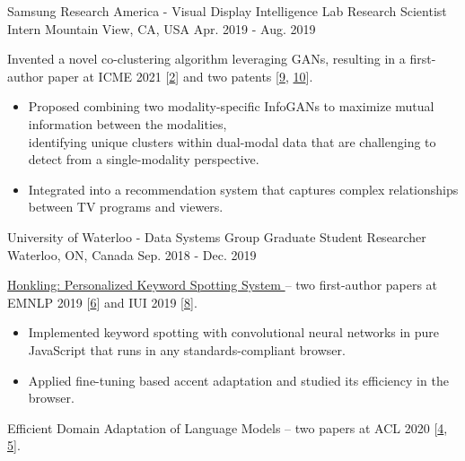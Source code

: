 \begin{cventries}
{\begin{cvitems}
\end{cvitems}
}
\cventry
{Samsung Research America - Visual Display Intelligence Lab} %
{Research Scientist Intern} %
{Mountain View, CA, USA} %
{Apr. 2019 - Aug. 2019} %
{ %
\begin{cvitems}
\item {Invented a novel co-clustering algorithm leveraging GANs, resulting in a first-author paper at ICME 2021 [\hyperlink{CI-GAN:ICME}{2}] and two patents [\hyperlink{CI-GAN:International}{9}, \hyperlink{CI-GAN:US}{10}].}
\begin{itemize}[label=$\cdot$,leftmargin=0.7em]
\item {Proposed combining two modality-specific InfoGANs to maximize mutual information between the modalities, \\ identifying unique clusters within dual-modal data that are challenging to detect from a single-modality perspective.}
\item {Integrated into a recommendation system that captures complex relationships between TV programs and viewers.}
\end{itemize}
\end{cvitems}
}
\cventry
{University of Waterloo - Data Systems Group} %
{Graduate Student Researcher} %
{Waterloo, ON, Canada} %
{Sep. 2018 - Dec. 2019} %
{ %
\begin{cvitems}
\item {\href{https://github.com/castorini/honkling}{Honkling: Personalized Keyword Spotting System {\small \faGithub}} -- two first-author papers at EMNLP 2019 [\hyperlink{honkling:EMNLP}{6}] and IUI 2019 [\hyperlink{honkling:IUI}{8}].}
\begin{itemize}[label=$\cdot$,leftmargin=0.7em]
\item {Implemented keyword spotting with convolutional neural networks in pure JavaScript that runs in any standards-compliant browser.}
\item {Applied fine-tuning based accent adaptation and studied its efficiency in the browser.}
\end{itemize}
\item {Efficient Domain Adaptation of Language Models -- two papers at ACL 2020 [\hyperlink{show:ACL}{4}, \hyperlink{DeeBERT:ACL}{5}].}
\begin{itemize}[label=$\cdot$,leftmargin=0.7em]

\end{itemize}
\end{cvitems}}
\end{cventries}
